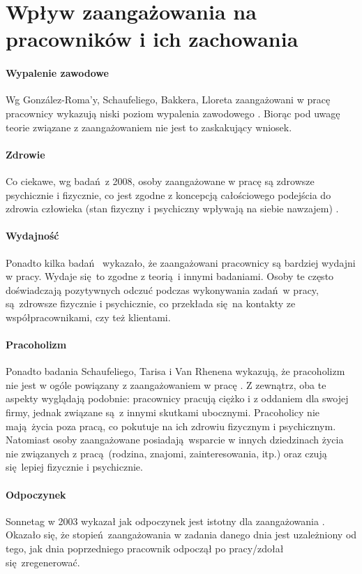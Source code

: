\section{Wpływ zaangażowania na pracowników i ich zachowania}
\label{sec:thoery-eng-infl2}
\paragraph{Wypalenie zawodowe}
Wg González-Roma'y, Schaufeliego, Bakkera, Lloreta zaangażowani w pracę pracownicy wykazują niski poziom wypalenia zawodowego \cite{gonzlez2006burnout}. Biorąc pod uwagę teorie związane z zaangażowaniem nie jest to zaskakujący wniosek.
\paragraph{Zdrowie}
Co ciekawe, wg badań z 2008, osoby zaangażowane w pracę są zdrowsze psychicznie i fizycznie, co jest zgodne z koncepcją całościowego podejścia do zdrowia człowieka (stan fizyczny i psychiczny wpływają na siebie nawzajem) \cite{schaufeli2008workaholism}.
\paragraph{Wydajność}
Ponadto kilka badań \cite{xanthopoulou2008working,xanthopoulou2009work} wykazało, że zaangażowani pracownicy są bardziej wydajni w pracy. Wydaje się to zgodne z teorią i innymi badaniami. Osoby te często doświadczają pozytywnych odczuć podczas wykonywania zadań w pracy, są zdrowsze fizycznie i psychicznie, co przekłada się na kontakty ze współpracownikami, czy też klientami.
\paragraph{Pracoholizm}
Ponadto badania Schaufeliego, Tarisa i Van Rhenena wykazują, że pracoholizm nie jest w ogóle powiązany z zaangażowaniem w pracę \cite{schaufeli2008workaholism}. Z zewnątrz, oba te aspekty wyglądają podobnie: pracownicy pracują ciężko i z oddaniem dla swojej firmy, jednak związane są z innymi skutkami ubocznymi. Pracoholicy nie mają życia poza pracą, co pokutuje na ich zdrowiu fizycznym i psychicznym. Natomiast osoby zaangażowane posiadają wsparcie w innych dziedzinach życia nie związanych z pracą (rodzina,
znajomi, zainteresowania, itp.) oraz czują się lepiej fizycznie i psychicznie.
\paragraph{Odpoczynek}
Sonnetag w 2003 wykazał jak odpoczynek jest istotny dla zaangażowania \cite{sonnentag2003recovery}. Okazało się, że stopień zaangażowania w zadania danego dnia jest uzależniony od tego, jak dnia poprzedniego pracownik odpoczął po pracy/zdołał się zregenerować.
